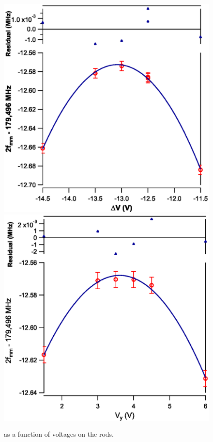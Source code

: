 \documentclass[landscape]{sciposter}
\begin{document}
\begin{multicols}{4}
\begin{figure}
\begin{center}
\includegraphics[scale = 0.8]{deltaV.eps}
\includegraphics[scale = 0.8]{Vy.eps}
\caption{ as a function of voltages on the rods.}
\label{nulling}
\end{center}
\end{figure}


\end{multicols}
\end{document}
